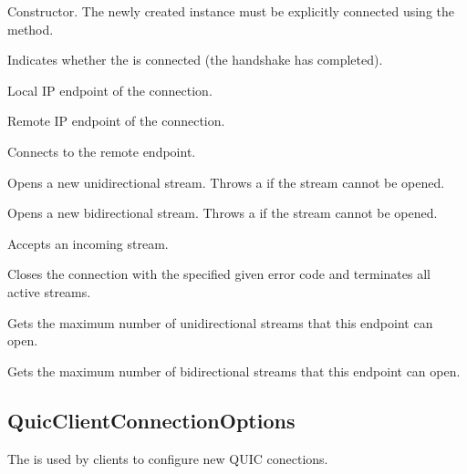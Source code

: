 \begin{description}

     Constructor. The newly created
instance must be explicitly connected using the  method.

     Indicates whether the \QuicConnection{} is
connected (the handshake has completed).

     Local IP endpoint of the connection.

     Remote IP endpoint of the connection.

     Connects to the remote endpoint.

     Opens a new unidirectional stream. Throws a
 if the stream cannot be opened.

     Opens a new bidirectional stream. Throws a
 if the stream cannot be opened.

     Accepts an
incoming stream.

     Closes the connection with
the specified given error code and terminates all active streams.

     Gets the maximum
number of unidirectional streams that this endpoint can open.

     Gets the maximum
number of bidirectional streams that this endpoint can open.

\end{description}

\subsection{QuicClientConnectionOptions}

The  is used by clients to configure new QUIC conections.

